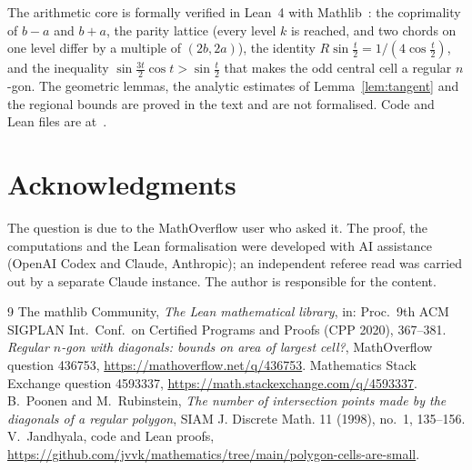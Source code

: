 \documentclass[11pt]{amsart}
\theoremstyle{remark}
\begin{document}
The arithmetic core is formally verified in Lean~4 with Mathlib~\cite{mathlib}: the coprimality of $b-a$ and $b+a$, the parity lattice (every level $k$ is reached, and two chords on one level differ by a multiple of $(2b,2a)$), the identity $R\sin\frac t2=1/(4\cos\frac t2)$, and the inequality $\sin\frac{3t}2\cos t>\sin\frac t2$ that makes the odd central cell a regular $n$-gon. The geometric lemmas, the analytic estimates of Lemma~\ref{lem:tangent} and the regional bounds are proved in the text and are not formalised. Code and Lean files are at~\cite{repo}.

\section*{Acknowledgments}

The question is due to the MathOverflow user who asked it. The proof, the computations and the Lean formalisation were developed with AI assistance (OpenAI Codex and Claude, Anthropic); an independent referee read was carried out by a separate Claude instance. The author is responsible for the content.

\begin{thebibliography}{9}
 The mathlib Community, \emph{The Lean mathematical library}, in: Proc.\ 9th ACM SIGPLAN Int.\ Conf.\ on Certified Programs and Proofs (CPP 2020), 367--381.
 \emph{Regular $n$-gon with diagonals: bounds on area of largest cell?}, MathOverflow question 436753, \url{https://mathoverflow.net/q/436753}.
 Mathematics Stack Exchange question 4593337, \url{https://math.stackexchange.com/q/4593337}.
 B.~Poonen and M.~Rubinstein, \emph{The number of intersection points made by the diagonals of a regular polygon}, SIAM J. Discrete Math. 11 (1998), no.~1, 135--156.
 V.~Jandhyala, code and Lean proofs, \url{https://github.com/jvvk/mathematics/tree/main/polygon-cells-are-small}.
\end{thebibliography}
\end{document}
